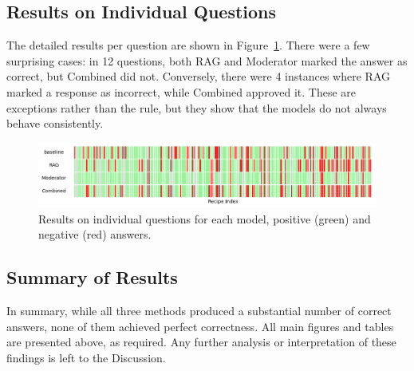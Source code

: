\subsection{Results on Individual Questions}

The detailed results per question are shown in Figure~\ref{fig:dna-results}. There were a few surprising cases: in 12 questions, both RAG and Moderator marked the answer as correct, but Combined did not. Conversely, there were 4 instances where RAG marked a response as incorrect, while Combined approved it. These are exceptions rather than the rule, but they show that the models do not always behave consistently.

\begin{figure}[H]
    \centering
    \includegraphics[width=1\linewidth]{figures/dna-results.png}
    \caption{Results on individual questions for each model, positive (green) and negative (red) answers.}
    \label{fig:dna-results}
\end{figure}

\subsection{Summary of Results}

In summary, while all three methods produced a substantial number of correct answers, none of them achieved perfect correctness. All main figures and tables are presented above, as required. Any further analysis or interpretation of these findings is left to the Discussion.